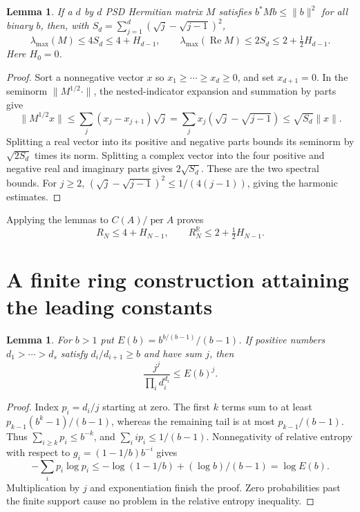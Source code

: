 \documentclass[11pt]{article}
\newtheorem{lemma}[theorem]{Lemma}
\DeclareMathOperator{\per}{per}
\DeclareMathOperator{\Ree}{Re}
\begin{document}
\begin{lemma}\label{lem:layer}
If a $d$ by $d$ PSD Hermitian matrix $M$ satisfies
$b^*Mb\le\|b\|^2$ for all binary $b$, then, with
$S_d=\sum_{j=1}^d(\sqrt j-\sqrt{j-1})^2$,
\[
 \lambda_{\max}(M)\le4S_d\le4+H_{d-1},\qquad
 \lambda_{\max}(\Ree M)\le2S_d\le2+\tfrac12H_{d-1}.
\]
Here $H_0=0$.
\end{lemma}
\begin{proof}
Sort a nonnegative vector $x$ so $x_1\ge\cdots\ge x_d\ge0$, and set
$x_{d+1}=0$. In the seminorm $\|M^{1/2}\cdot\|$, the nested-indicator
expansion and summation by parts give
\[
 \|M^{1/2}x\|
 \le\sum_j(x_j-x_{j+1})\sqrt j
 =\sum_jx_j(\sqrt j-\sqrt{j-1})
 \le\sqrt{S_d}\|x\|.
\]
Splitting a real vector into its positive and negative parts bounds its
seminorm by $\sqrt{2S_d}$ times its norm. Splitting a complex vector into the
four positive and negative real and imaginary parts gives $2\sqrt{S_d}$.
These are the two spectral bounds. For $j\ge2$,
$(\sqrt j-\sqrt{j-1})^2\le1/(4(j-1))$, giving the harmonic estimates.
\end{proof}
Applying the lemmas to $C(A)/\per A$ proves
\begin{equation}\label{eq:upper}
 R_N\le4+H_{N-1},\qquad R_N^{\mathbb R}\le2+\tfrac12H_{N-1}.
\end{equation}

\section{A finite ring construction attaining the leading constants}
\begin{lemma}\label{lem:entropy}
For $b>1$ put $E(b)=b^{b/(b-1)}/(b-1)$. If positive numbers
$d_1>\cdots>d_s$ satisfy $d_i/d_{i+1}\ge b$ and have sum $j$, then
\[
 \frac{j^j}{\prod_i d_i^{d_i}}\le E(b)^j.
\]
\end{lemma}
\begin{proof}
Index $p_i=d_i/j$ starting at zero. The first $k$ terms sum to at least
$p_{k-1}(b^k-1)/(b-1)$, whereas the remaining tail is at most
$p_{k-1}/(b-1)$. Thus $\sum_{i\ge k}p_i\le b^{-k}$, and
$\sum_i i p_i\le1/(b-1)$. Nonnegativity of relative entropy with respect to
$g_i=(1-1/b)b^{-i}$ gives
\[
 -\sum_i p_i\log p_i
 \le-\log(1-1/b)+(\log b)/(b-1)=\log E(b).
\]
Multiplication by $j$ and exponentiation finish the proof. Zero probabilities
past the finite support cause no problem in the relative entropy inequality.
\end{proof}
\end{document}
